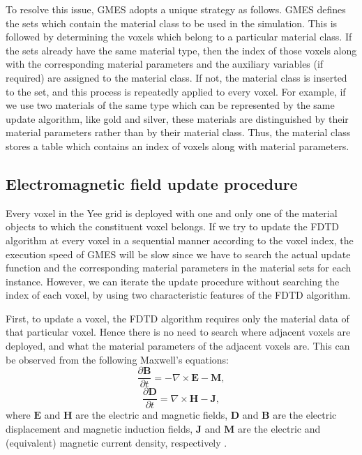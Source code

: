 To resolve this issue, GMES adopts a unique strategy as follows. GMES defines the sets which contain the material class to be used in the simulation. This is followed by determining the voxels which belong to a particular material class. If the sets already have the same material type, then the index of those voxels along with the corresponding material parameters and the auxiliary variables (if required) are assigned to the material class. If not, the material class is inserted to the set, and this process is repeatedly applied to every voxel. For example, if we use two materials of the same type which can be represented by the same update algorithm, like gold and silver, these materials are distinguished by their material parameters rather than by their material class. Thus, the material class stores a table which contains an index of voxels along with material parameters.

\subsection{Electromagnetic field update procedure}
Every voxel in the Yee grid is deployed with one and only one of the material objects to which the constituent voxel belongs. If we try to update the FDTD algorithm at every voxel in a sequential manner according to the voxel index, the execution speed of GMES will be slow since we have to search the actual update function and the corresponding material parameters in the material sets for each instance. However, we can iterate the update procedure without searching the index of each voxel, by using two characteristic features of the FDTD algorithm. 

First, to update a voxel, the FDTD algorithm requires only the material data of that particular voxel. Hence there is no need to search where adjacent voxels are deployed, and what the material parameters of the adjacent voxels are. This can be observed from the following Maxwell's equations:
\begin{equation}
\frac{\partial \mathbf B}{\partial t} = -\nabla \times \mathbf E - \mathbf M,
\end{equation}
\begin{equation}
\frac{\partial \mathbf D}{\partial t} = \nabla \times \mathbf H - \mathbf J,
\end{equation}
where $\mathbf E$ and $\mathbf H$ are the electric and magnetic fields, $\mathbf D$ and $\mathbf B$ are the electric displacement and magnetic induction fields, $\mathbf J$ and $\mathbf M$ are the electric and (equivalent) magnetic current density, respectively \cite{jackson_classical_1998,taflove_computational_2005}. 

